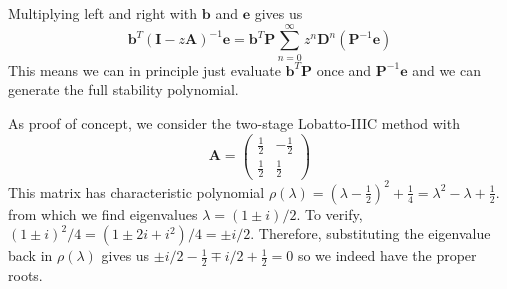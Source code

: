 \documentclass[10pt,a4paper]{article}
\newcommand{\half}[0]{\frac{1}{2}}
\newcommand{\bvec}[1]{\mathbf{#1}}
\begin{document}
Multiplying left and right with $\bvec{b}$ and $\bvec{e}$ gives us
\begin{equation*}
  \bvec{b}^T(\bvec{I}-z\bvec{A})^{-1}\bvec{e} = \bvec{b}^T\bvec{P}  \sum_{n=0}^{\infty} z^n \bvec{D}^n  (\bvec{P}^{-1}\bvec{e})
\end{equation*}
This means we can in principle just evaluate $\bvec{b}^{T}\bvec{P}$ once and $\bvec{P}^{-1}\bvec{e}$ and we can generate the full stability polynomial.

As proof of concept, we consider the two-stage Lobatto-IIIC method with
\begin{equation*}
  \bvec{A} = \begin{pmatrix}
    \half & -\half \\
    \half & \half
  \end{pmatrix}
\end{equation*}
This matrix has characteristic polynomial $\rho(\lambda) = (\lambda - \half)^2 + \frac{1}{4} = \lambda^2 - \lambda + \half.$ from which we find eigenvalues $\lambda = (1 \pm i)/2.$ To verify, $(1 \pm i)^2/4 = (1 \pm 2i + i^2)/4 = \pm i/2.$ Therefore, substituting the eigenvalue back in $\rho(\lambda)$ gives us $\pm i/2 - \half \mp i/2 + \half=0$ so we indeed have the proper roots.
\end{document}
